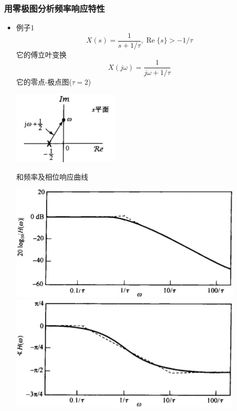 \documentclass[CJKutf8,dvipsnames,table]{beamer}
\begin{document}
\begin{CJK*}{UTF8}{song}
  \begin{frame}
    \frametitle{用零极图分析频率响应特性}
    \begin{itemize}
    \item 例子1   
\[
X(s)=\frac{1}{s+1/\tau}, \operatorname{Re}\{s\} > -1/\tau
\]
它的傅立叶变换
\[
X(j\omega)=\frac{1}{j\omega+1/\tau}
\]
它的零点-极点图($\tau=2$)
    \begin{center}
      \includegraphics[scale=.5]{ss-c-f9-16}
    \end{center}
    和频率及相位响应曲线
    \begin{center}
      \includegraphics[scale=.27]{ss-c-f9-18a}
      \includegraphics[scale=.27]{ss-c-f9-18b}
    \end{center}

    \end{itemize}
     
  \end{frame}     
  

\end{CJK*}
\end{document}
